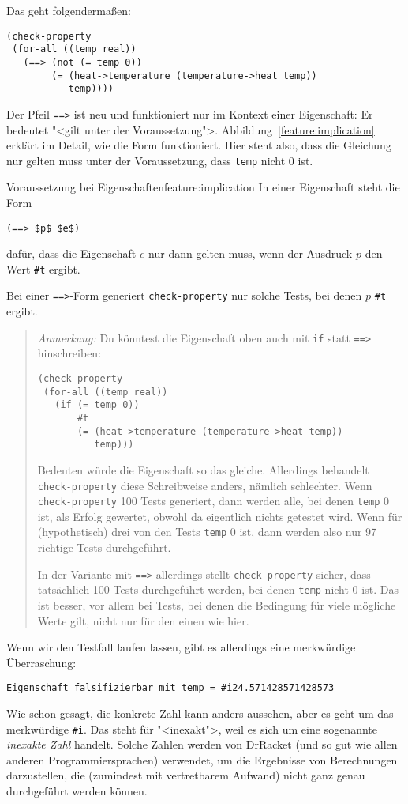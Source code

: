 Das geht folgendermaßen:
%
\begin{lstlisting}
(check-property
 (for-all ((temp real))
   (==> (not (= temp 0))
        (= (heat->temperature (temperature->heat temp))
           temp))))
\end{lstlisting}
%
Der Pfeil \lstinline{==>} ist neu und funktioniert nur im Kontext
einer Eigenschaft: Er bedeutet "<gilt unter der Voraussetzung">.
Abbildung~\ref{feature:implication} erklärt im Detail, wie die Form
funktioniert.  Hier steht also, dass die Gleichung nur gelten muss
unter der Voraussetzung, dass \lstinline{temp} nicht 0 ist.

\begin{feature}{Voraussetzung bei Eigenschaften}{feature:implication}
  In einer Eigenschaft steht die Form
\begin{lstlisting}
(==> $p$ $e$)
\end{lstlisting}
  dafür, dass die Eigenschaft $e$ nur dann gelten muss, wenn der
  Ausdruck $p$ den Wert \lstinline{#t} ergibt.

  Bei einer \lstinline{==>}-Form generiert \lstinline{check-property}
  nur solche Tests, bei denen $p$ \lstinline{#t} ergibt.
\end{feature}
%
\begin{quote}
\noindent \emph{Anmerkung:} Du könntest die Eigenschaft oben
auch mit \lstinline{if} statt \lstinline{==>} hinschreiben:
%
\begin{lstlisting}
(check-property
 (for-all ((temp real))
   (if (= temp 0))
       #t
       (= (heat->temperature (temperature->heat temp))
          temp)))
\end{lstlisting}
%
Bedeuten würde die Eigenschaft so das gleiche.  Allerdings behandelt
\lstinline{check-property} diese Schreibweise anders, nämlich
schlechter.  Wenn \lstinline{check-property} 100 Tests generiert, dann
werden alle, bei denen \lstinline{temp} 0 ist, als Erfolg gewertet,
obwohl da eigentlich nichts getestet wird.  Wenn für (hypothetisch)
drei von den Tests \lstinline{temp} 0 ist, dann werden also nur 97
richtige Tests durchgeführt.

In der Variante mit \lstinline{==>} allerdings stellt
\lstinline{check-property} sicher, dass tatsächlich 100 Tests
durchgeführt werden, bei denen \lstinline{temp} nicht 0 ist.  Das ist
besser, vor allem bei Tests, bei denen die Bedingung für viele
mögliche Werte gilt, nicht nur für den einen wie hier.
\end{quote}
%
Wenn wir den Testfall laufen lassen, gibt es allerdings eine
merkwürdige Überraschung:
%
\begin{lstlisting}
Eigenschaft falsifizierbar mit temp = #i24.571428571428573
\end{lstlisting}
%
Wie schon gesagt, die konkrete Zahl kann anders aussehen, aber es geht
um das merkwürdige \lstinline{#i}.  Das steht für "<inexakt">, weil es
sich um eine sogenannte \textit{inexakte Zahl}
handelt.  Solche Zahlen werden von DrRacket (und so gut wie allen
anderen Programmiersprachen) verwendet, um die Ergebnisse von
Berechnungen darzustellen, die (zumindest mit vertretbarem Aufwand)
nicht ganz genau durchgeführt werden können.

